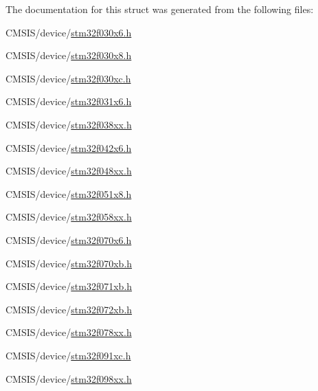 The documentation for this struct was generated from the following files\+:\begin{DoxyCompactItemize}
\item 
C\+M\+S\+I\+S/device/\hyperlink{stm32f030x6_8h}{stm32f030x6.\+h}\item 
C\+M\+S\+I\+S/device/\hyperlink{stm32f030x8_8h}{stm32f030x8.\+h}\item 
C\+M\+S\+I\+S/device/\hyperlink{stm32f030xc_8h}{stm32f030xc.\+h}\item 
C\+M\+S\+I\+S/device/\hyperlink{stm32f031x6_8h}{stm32f031x6.\+h}\item 
C\+M\+S\+I\+S/device/\hyperlink{stm32f038xx_8h}{stm32f038xx.\+h}\item 
C\+M\+S\+I\+S/device/\hyperlink{stm32f042x6_8h}{stm32f042x6.\+h}\item 
C\+M\+S\+I\+S/device/\hyperlink{stm32f048xx_8h}{stm32f048xx.\+h}\item 
C\+M\+S\+I\+S/device/\hyperlink{stm32f051x8_8h}{stm32f051x8.\+h}\item 
C\+M\+S\+I\+S/device/\hyperlink{stm32f058xx_8h}{stm32f058xx.\+h}\item 
C\+M\+S\+I\+S/device/\hyperlink{stm32f070x6_8h}{stm32f070x6.\+h}\item 
C\+M\+S\+I\+S/device/\hyperlink{stm32f070xb_8h}{stm32f070xb.\+h}\item 
C\+M\+S\+I\+S/device/\hyperlink{stm32f071xb_8h}{stm32f071xb.\+h}\item 
C\+M\+S\+I\+S/device/\hyperlink{stm32f072xb_8h}{stm32f072xb.\+h}\item 
C\+M\+S\+I\+S/device/\hyperlink{stm32f078xx_8h}{stm32f078xx.\+h}\item 
C\+M\+S\+I\+S/device/\hyperlink{stm32f091xc_8h}{stm32f091xc.\+h}\item 
C\+M\+S\+I\+S/device/\hyperlink{stm32f098xx_8h}{stm32f098xx.\+h}\end{DoxyCompactItemize}
